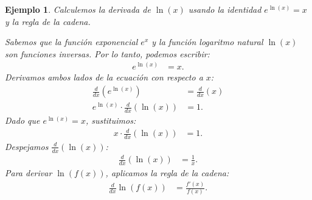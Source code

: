 \documentclass[12pt, a4paper]{article}
\theoremstyle{rioplatense}
\newtheorem{ejemplo}{Ejemplo}[section]
\begin{document}
\begin{ejemplo}
Calculemos la derivada de $\ln(x)$ usando la identidad $e^{\ln(x)} = x$ y la regla de la cadena.

Sabemos que la función exponencial $e^x$ y la función logaritmo natural $\ln(x)$ son funciones inversas. Por lo tanto, podemos escribir:
\begin{align*}
e^{\ln(x)} &= x.
\end{align*}
Derivamos ambos lados de la ecuación con respecto a $x$:
\begin{align*}
\frac{d}{dx} \left( e^{\ln(x)} \right) &= \frac{d}{dx} (x) \\
e^{\ln(x)} \cdot \frac{d}{dx} (\ln(x)) &= 1.
\end{align*}
Dado que $e^{\ln(x)} = x$, sustituimos:
\begin{align*}
x \cdot \frac{d}{dx} (\ln(x)) &= 1.
\end{align*}
Despejamos $\frac{d}{dx} (\ln(x))$:
\begin{align*}
\frac{d}{dx} (\ln(x)) &= \frac{1}{x}.
\end{align*}
Para derivar $\ln(f(x))$, aplicamos la regla de la cadena:
\begin{align*}
\frac{d}{dx} \ln(f(x)) &= \frac{f'(x)}{f(x)}.
\end{align*}
\end{ejemplo}
\end{document}
